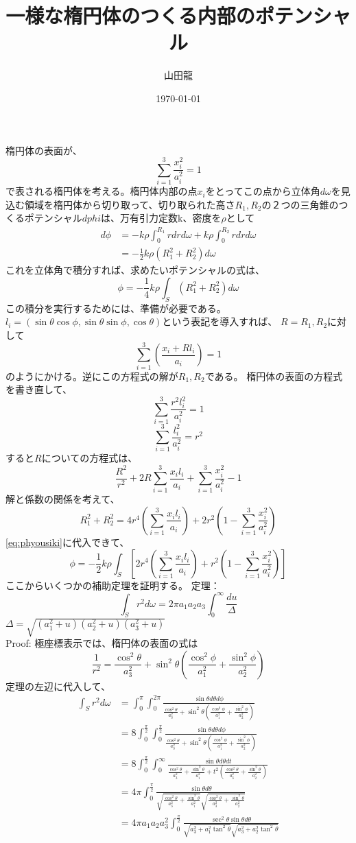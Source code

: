 \documentclass{jsarticle}
\date{\today}
\author{山田龍}
\title{一様な楕円体のつくる内部のポテンシャル}
\newcommand{\half}{\frac{1}{2}}
\newcommand{\beq}{\begin{equation}}
\newcommand{\eeq}{\end{equation}}
\newcommand{\xid}{x_i^2}
\newcommand{\lid}{l_i^2}
\newcommand{\aid}{a_i^2}
\newcommand{\sumit}{\sum_{i=1}^3}
\newcommand{\cosdt}{\cos^2\theta}
\newcommand{\sindt}{\sin^2\theta}
\newcommand{\tandt}{\tan^2\theta}
\newcommand{\cosdp}{\cos^2\phi}
\newcommand{\sindp}{\sin^2\phi}
\begin{document}
\maketitle
\section{}
楕円体の表面が、
\beq
\sum_{i=1}^3 \frac{\xid}{\aid} = 1
\eeq
で表される楕円体を考える。楕円体内部の点$x_i$をとってこの点から立体角$d\omega$を見込む領域を楕円体から切り取って、切り取られた高さ$R_1, R_2$の２つの三角錐のつくるポテンシャル$dphi$は、万有引力定数k、密度を$\rho$として
\begin{align}
d\phi &= -k \rho \int_{0}^{R_1} r dr d\omega +
k \rho \int_{0}^{R_2} r dr d\omega\\
      &=  -\half k \rho (R_1^2 + R_2^2) d\omega
\end{align}
これを立体角で積分すれば、求めたいポテンシャルの式は、
\beq
\phi = -\frac{1}{4} k \rho \int_S (R_1^2 + R_2^2) d\omega\label{eq:phyousiki}
\eeq
この積分を実行するためには、準備が必要である。
$l_i = (\sin\theta \cos\phi, \sin\theta \sin\phi ,\cos\theta)$という表記を導入すれば、
$R = R_1, R_2$に対して
\beq
\sum_{i=1}^3 \left (\frac{x_i + R l_i}{a_i} \right) = 1\label{eq:daenl}
\eeq
のようにかける。逆にこの方程式の解が$R_1,R_2$である。
楕円体の表面の方程式を書き直して、
\beq
\sum_{i=1}^3 \frac{r^2 \lid}{\aid} = 1
\eeq
\beq
\sum_{i=1}^3 \frac{\lid}{\aid} = r^2
\eeq
すると$R$についての方程式は、
\beq
\frac{R^2}{r^2} + 2R\sumit \frac{x_i l_i}{a_i} + \sumit \frac{\xid}{\aid} - 1
\eeq
解と係数の関係を考えて、
\beq
R_1^2 + R_2^2 = 4r^4 \left(\sumit \frac{x_i l_i}{a_i} \right) + 2r^2 \left(1 -  \sumit \frac{\xid}{\aid}
\right)
\eeq
\eqref{eq:phyousiki}に代入できて、
\beq
\phi = -\frac{1}{2} k \rho \int_S \left[2r^4 \left(\sumit \frac{x_i l_i}{a_i} \right) + r^2 \left(1 -  \sumit \frac{\xid}{\aid}\right)\right]
\label{eq:steptwo}
\eeq
ここからいくつかの補助定理を証明する。
定理：
\beq
\int _S r^2 d\omega = 2 \pi a_1 a_2 a_3 \int_0^{\infty} \frac{du}{\Delta}
\eeq
$\Delta = \sqrt{(a_1^2 + u)(a_2^2 + u)(a_3^2 + u)}$\\
Proof:
極座標表示では、楕円体の表面の式は
\beq
\frac{1}{r^2} = \frac{\cosdt}{a_3^2} + \sindt(\frac{\cosdp}{a_1^2} + \frac{\sindp}{a_2^2})
\eeq
定理の左辺に代入して、
\begin{align}
    \int_S r^2 d\omega &= \int_0^\pi \int_0^{2\pi}
    \frac{\sin\theta d\theta d\phi}{\frac{\cosdt}{a_3^2} + \sindt(\frac{\cosdp}{a_1^2} + \frac{\sindp}{a_2^2})
}\\
&= 8 \int_0^{\frac{\pi}{2}} \int_0^{\frac{\pi}{2}}
    \frac{\sin\theta d\theta d\phi}{\frac{\cosdt}{a_3^2} + \sindt(\frac{\cosdp}{a_1^2} + \frac{\sindp}{a_2^2})
}\\
&= 8 \int_0^{\frac{\pi}{2}} \int_0^{\infty}
\frac{\sin\theta d\theta dt}{\frac{\cosdt}{a_3^2} +\frac{\sindt}{a_1^2} + t^2(\frac{\cosdt}{a_3^2} + \frac{\sindt}{a_2^2})
}\\
&= 4\pi \int_0^{\frac{\pi}{2}} \frac{\sin\theta d\theta}{\sqrt{\frac{\cosdt}{a_3^2} +\frac{\sindt}{a_1^2}} \sqrt{\frac{\cosdt}{a_3^2} + \frac{\sindt}{a_2^2}
}}\\
&= 4\pi a_1 a_2 a_3^2
\int_0^{\frac{\pi}{2}} \frac{\sec^2\theta \sin\theta d\theta}
{\sqrt{a_3^2 +a_1^2\tandt} \sqrt{a_3^2 + a_2^2 \tandt}}
\end{align}
\end{document}
